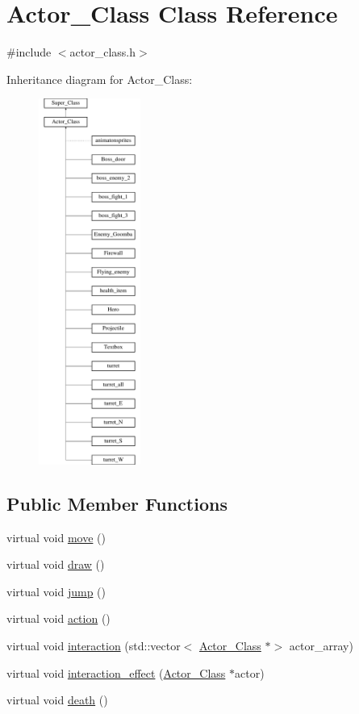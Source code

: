 \hypertarget{class_actor___class}{}\section{Actor\+\_\+\+Class Class Reference}
\label{class_actor___class}


{\ttfamily \#include $<$actor\+\_\+class.\+h$>$}

Inheritance diagram for Actor\+\_\+\+Class\+:\begin{figure}[H]
\begin{center}
\leavevmode
\includegraphics[height=12.000000cm]{class_actor___class}
\end{center}
\end{figure}
\subsection*{Public Member Functions}
\begin{DoxyCompactItemize}
\item 
virtual void \hyperlink{class_actor___class_af1764a94c5410ba8476f56553cd2c327}{move} ()
\item 
virtual void \hyperlink{class_actor___class_ac49cd62be76b4b950ecbe155413f1b64}{draw} ()
\item 
virtual void \hyperlink{class_actor___class_ab33216a3ce0c856bdc16231c71ae35c2}{jump} ()
\item 
virtual void \hyperlink{class_actor___class_ab8e23ffae108da3b8eda67c6753bdae0}{action} ()
\item 
virtual void \hyperlink{class_actor___class_a87d1e079d8576fa99592a60b38a04a1b}{interaction} (std\+::vector$<$ \hyperlink{class_actor___class}{Actor\+\_\+\+Class} $\ast$$>$ actor\+\_\+array)
\item 
virtual void \hyperlink{class_actor___class_af3488ca470eb77255060142fd167aa72}{interaction\+\_\+effect} (\hyperlink{class_actor___class}{Actor\+\_\+\+Class} $\ast$actor)
\item 
virtual void \hyperlink{class_actor___class_a9447c6154a674d7e6bdf24ff2874b7a8}{death} ()
\end{DoxyCompactItemize}
